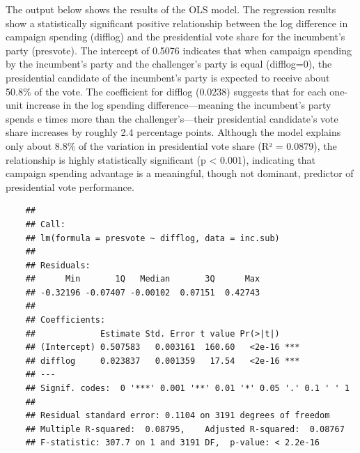 \documentclass[
]{article}
\begin{document}
The output below shows the results of the OLS model. The regression results show a statistically significant positive relationship between the log difference in campaign spending (difflog) and the presidential vote share for the incumbent’s party (presvote). The intercept of 0.5076 indicates that when campaign spending by the incumbent’s party and the challenger’s party is equal (difflog=0), the presidential candidate of the incumbent’s party is expected to receive about 50.8\% of the vote. The coefficient for difflog (0.0238) suggests that for each one-unit increase in the log spending difference—meaning the incumbent’s party spends e times more than the challenger’s—their presidential candidate’s vote share increases by roughly 2.4 percentage points. Although the model explains only about 8.8\% of the variation in presidential vote share (R² = 0.0879), the relationship is highly statistically significant (p < 0.001), indicating that campaign spending advantage is a meaningful, though not dominant, predictor of presidential vote performance. \newpage

\begin{verbatim}
	## 
	## Call:
	## lm(formula = presvote ~ difflog, data = inc.sub)
	## 
	## Residuals:
	##      Min       1Q   Median       3Q      Max 
	## -0.32196 -0.07407 -0.00102  0.07151  0.42743 
	## 
	## Coefficients:
	##             Estimate Std. Error t value Pr(>|t|)    
	## (Intercept) 0.507583   0.003161  160.60   <2e-16 ***
	## difflog     0.023837   0.001359   17.54   <2e-16 ***
	## ---
	## Signif. codes:  0 '***' 0.001 '**' 0.01 '*' 0.05 '.' 0.1 ' ' 1
	## 
	## Residual standard error: 0.1104 on 3191 degrees of freedom
	## Multiple R-squared:  0.08795,    Adjusted R-squared:  0.08767 
	## F-statistic: 307.7 on 1 and 3191 DF,  p-value: < 2.2e-16
\end{verbatim}
\vspace{.5cm}
\end{document}
